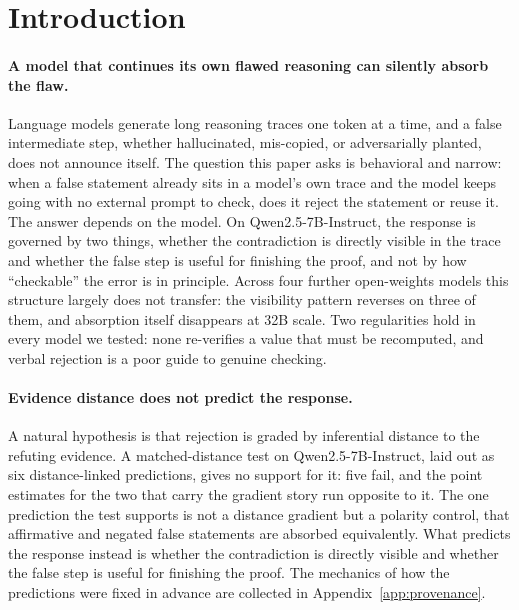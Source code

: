\section{Introduction}
\label{sec:intro}


\paragraph{A model that continues its own flawed reasoning can silently
absorb the flaw.} Language models generate long reasoning traces one token
at a time, and a false intermediate step, whether hallucinated, mis-copied,
or adversarially planted, does not announce itself. The question this paper
asks is behavioral and narrow: when a false statement already sits in a
model's own trace and the model keeps going with no external prompt to
check, does it reject the statement or reuse it. The answer depends on the
model. On Qwen2.5-7B-Instruct, the response is governed by two things,
whether the contradiction is directly visible in the trace and whether the
false step is useful for finishing the proof, and not by how ``checkable''
the error is in principle. Across four further open-weights models this
structure largely does not transfer: the visibility pattern reverses on
three of them, and absorption itself disappears at 32B scale. Two
regularities hold in every model we tested: none re-verifies a value that
must be recomputed, and verbal rejection is a poor guide to genuine
checking.

\paragraph{Evidence distance does not predict the response.} A natural
hypothesis is that rejection is graded by inferential distance to the
refuting evidence. A matched-distance test on Qwen2.5-7B-Instruct, laid out
as six distance-linked predictions, gives no support for it: five fail, and
the point estimates for the two that carry the gradient story run opposite to
it.
The one prediction the test supports is not a distance gradient but a
polarity control, that affirmative and negated false statements are absorbed
equivalently. What predicts the response instead is whether the contradiction
is directly visible and whether the false step is useful for finishing the
proof. The mechanics of how the predictions were fixed in advance are
collected in Appendix~\ref{app:provenance}.


